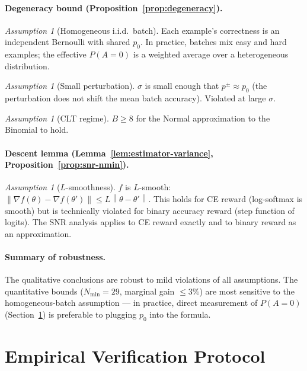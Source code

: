 \documentclass[11pt]{article}
\theoremstyle{definition}
\theoremstyle{remark}
\newtheorem{assumption}[theorem]{Assumption}
\newcommand{\norm}[1]{\left\|#1\right\|}
\newcommand{\Nmin}{N_{\mathrm{min}}}
\begin{document}
\paragraph{Degeneracy bound (Proposition~\ref{prop:degeneracy}).}
\begin{assumption}[Homogeneous i.i.d.\ batch]
Each example's correctness is an independent Bernoulli with shared $p_0$. In practice, batches mix easy and hard examples; the effective $P(A=0)$ is a weighted average over a heterogeneous distribution.
\end{assumption}
\begin{assumption}[Small perturbation]
$\sigma$ is small enough that $p^\pm \approx p_0$ (the perturbation does not shift the mean batch accuracy). Violated at large $\sigma$.
\end{assumption}
\begin{assumption}[CLT regime]
$B \geq 8$ for the Normal approximation to the Binomial to hold.
\end{assumption}

\paragraph{Descent lemma (Lemma~\ref{lem:estimator-variance}, Proposition~\ref{prop:snr-nmin}).}
\begin{assumption}[$L$-smoothness]
$f$ is $L$-smooth: $\norm{\nabla f(\theta) - \nabla f(\theta')} \leq L\norm{\theta-\theta'}$. This holds for CE reward (log-softmax is smooth) but is technically violated for binary accuracy reward (step function of logits). The SNR analysis applies to CE reward exactly and to binary reward as an approximation.
\end{assumption}

\paragraph{Summary of robustness.}
The qualitative conclusions are robust to mild violations of all assumptions. The quantitative bounds ($\Nmin = 29$, marginal gain $\leq 3\%$) are most sensitive to the homogeneous-batch assumption --- in practice, direct measurement of $P(A=0)$ (Section~\ref{sec:empirical-probe}) is preferable to plugging $p_0$ into the formula.

\section{Empirical Verification Protocol}
\label{sec:empirical-probe}
\end{document}
